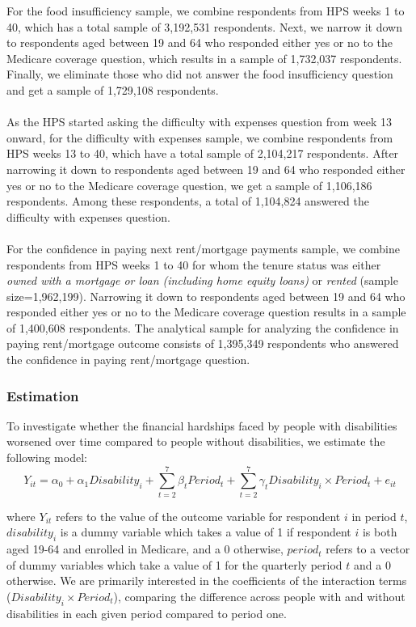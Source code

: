 \documentclass[12pt]{article}
\begin{document}
For the food insufficiency sample, we combine respondents from HPS weeks 1 to 40, which has a total sample of 3,192,531 respondents. Next, we narrow it down to respondents aged between 19 and 64 who responded either yes or no to the Medicare coverage question, which results in a sample  of 1,732,037 respondents. Finally, we eliminate those who did not answer the food insufficiency question and get a sample of 1,729,108 respondents. \\
\\
As the HPS started asking the difficulty with expenses question from week 13 onward, for the difficulty with expenses sample, we combine respondents from HPS weeks 13 to 40, which have a total sample of 2,104,217 respondents. After narrowing it down to respondents aged between 19 and 64 who responded either yes or no to the Medicare coverage question, we get a sample of 1,106,186 respondents. Among these respondents, a total of 1,104,824 answered the difficulty with expenses question. \\
\\
For the confidence in paying next rent/mortgage payments sample, we combine respondents from HPS weeks 1 to 40 for whom the tenure status was either \emph{owned with a mortgage or loan (including home equity loans)} or \emph{rented} (sample size=1,962,199). Narrowing it down to respondents aged between 19 and 64 who responded either yes or no to the Medicare coverage question results in a sample of 1,400,608 respondents. The analytical sample for analyzing the confidence in paying rent/mortgage outcome consists of 1,395,349 respondents who answered the confidence in paying rent/mortgage question.

\subsubsection{Estimation}
To investigate whether the financial hardships faced by people with disabilities worsened over time compared to people without disabilities, we estimate the following model: \\
\begin{equation}\label{eqn2}
Y_{it}= \alpha_0+\alpha_1 Disability_i+\sum_{t=2}^{7} \beta_t Period_t+\sum_{t=2}^{7} \gamma_t Disability_i \times Period_t
+e_{it} 
\end{equation}

where $Y_{it}$ refers to the value of the outcome variable for respondent $i$ in period $t$, $disability_i$ is a dummy variable which takes a value of 1 if respondent $i$ is both aged 19-64 and enrolled in Medicare, and a 0 otherwise, $period_t$ refers to a vector of dummy variables which take a value of 1 for the quarterly period $t$ and a 0 otherwise. We are primarily interested in the coefficients of the interaction terms ($Disability_i \times Period_t$), comparing the difference across people with and without disabilities in each given period compared to period one.  \\
\end{document}
